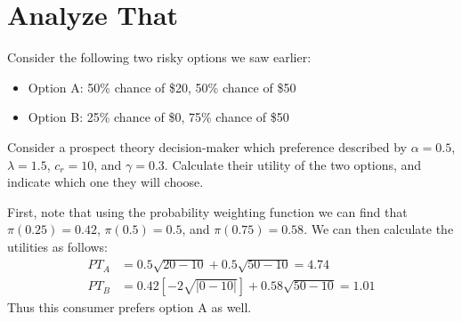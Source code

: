 \documentclass[solutions]{problem-set}
\begin{document}
\begin{enumerate}[label=(\alph*)]
\begin{soln}
\end{soln}

	
\end{enumerate}


\section{Analyze That}

Consider the following two risky options we saw  earlier:

\begin{itemize}
    \item Option A: 50\% chance of \$20, 50\% chance of \$50
    \item Option B: 25\% chance of \$0, 75\% chance of \$50
\end{itemize}

Consider a prospect theory decision-maker which preference described by $\alpha = 0.5$, $\lambda = 1.5$, $c_r=10$, and $\gamma  = 0.3$.  Calculate their utility of the two options, and indicate which one they will choose.
	
\begin{soln}
First, note that using the probability weighting function we can find that $\pi(0.25) = 0.42$, $\pi(0.5) = 0.5$, and $\pi(0.75) = 0.58$.  We can then calculate the utilities as follows:
\begin{align*}
PT_A &= 0.5 \sqrt{20-10} + 0.5 \sqrt{50-10} = 4.74 \\
PT_B &= 0.42 \left [-2 \sqrt{|0-10|}\right ] + 0.58 \sqrt{50-10} =1.01 %
\end{align*}
Thus this consumer prefers option A as well.
\end{soln}	
\end{document}
